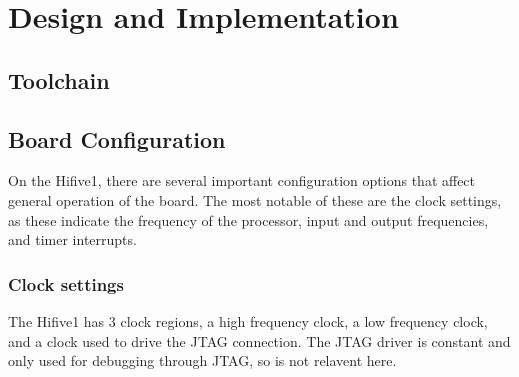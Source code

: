 \chapter{Design and Implementation}
\label{cha:design}
\section{Toolchain}
\section{Board Configuration}
On the Hifive1, there are several important configuration options that affect general operation of the board. The most notable of these are the clock settings, as these indicate the frequency of the processor, input and output frequencies, and timer interrupts. 
\subsection{Clock settings}
The Hifive1 has 3 clock regions, a high frequency clock, a low frequency clock, and a clock used to drive the JTAG connection. The JTAG driver is constant and only used for debugging through JTAG, so is not relavent here.
\\

